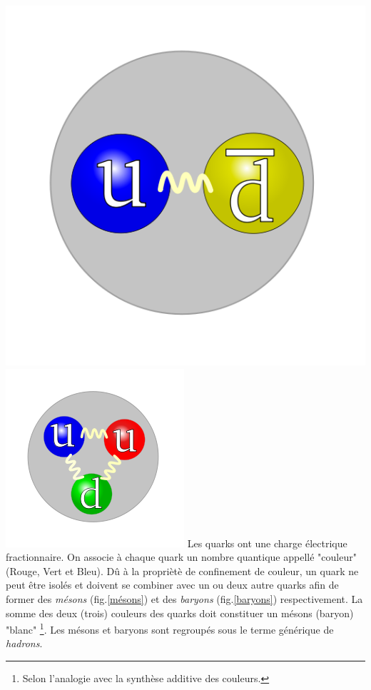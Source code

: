 {
	\includegraphics[width=\marginparwidth]{SM/quarks2.png}
    	\label{mésons}
    \includegraphics[width=\marginparwidth]{SM/quarks.png}
    	\label{baryons}
}
Les quarks ont une charge électrique fractionnaire. On associe à chaque quark un nombre quantique appellé "couleur" (Rouge, Vert et Bleu). Dû à la propriètè de confinement de couleur, un quark ne peut être isolés et doivent se combiner avec un ou deux autre quarks afin de former des \textit{mésons} (fig.\ref{mésons}) et des \textit{baryons} (fig.\ref{baryons}) respectivement. La somme des deux (trois) couleurs des quarks doit constituer un mésons (baryon) "blanc" \footnote{Selon l'analogie avec la synthèse additive des couleurs.}. Les mésons et baryons sont regroupés sous le terme générique de \textit{hadrons}.

